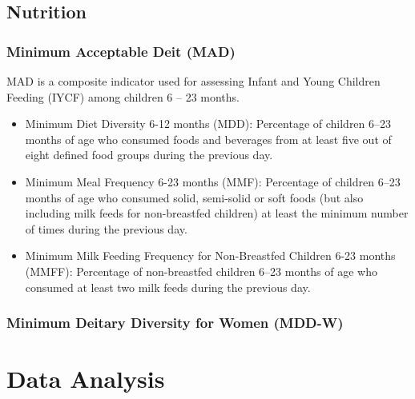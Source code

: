 \documentclass[
  letterpaper,
  DIV=11,
  numbers=noendperiod]{scrreprt}
\begin{document}
\section{Nutrition}\label{nutrition}

\subsection{Minimum Acceptable Deit
(MAD)}\label{minimum-acceptable-deit-mad}

MAD is a composite indicator used for assessing Infant and Young
Children Feeding (IYCF) among children 6 -- 23 months.

\begin{itemize}
\item
  Minimum Diet Diversity 6-12 months (MDD): Percentage of children 6--23
  months of age who consumed foods and beverages from at least five out
  of eight defined food groups during the previous day.
\item
  Minimum Meal Frequency 6-23 months (MMF): Percentage of children 6--23
  months of age who consumed solid, semi-solid or soft foods (but also
  including milk feeds for non-breastfed children) at least the minimum
  number of times during the previous day.
\item
  Minimum Milk Feeding Frequency for Non-Breastfed Children 6-23 months
  (MMFF): Percentage of non-breastfed children 6--23 months of age who
  consumed at least two milk feeds during the previous day.
\end{itemize}

\subsection{Minimum Deitary Diversity for Women
(MDD-W)}\label{minimum-deitary-diversity-for-women-mdd-w}


\chapter{Data Analysis}\label{data-analysis}
\end{document}

